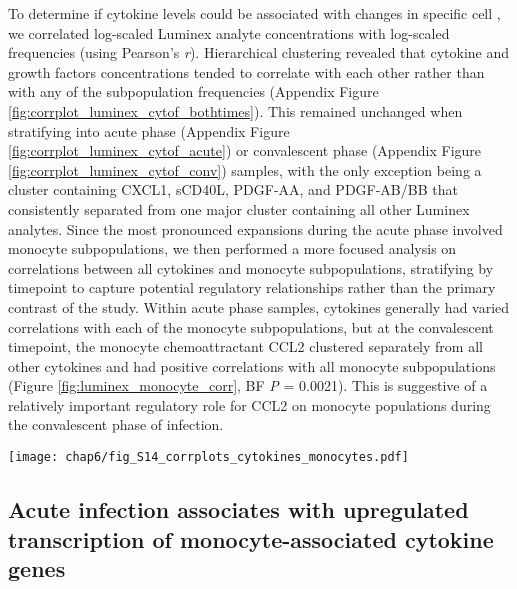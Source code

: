To determine if cytokine levels could be associated with changes in specific cell \subcommunities{}, we correlated log-scaled Luminex analyte concentrations with log-scaled \subcommunity{} frequencies (using Pearson’s \emph{r}). Hierarchical clustering revealed that cytokine and growth factors concentrations tended to correlate with each other rather than with any of the subpopulation frequencies (Appendix Figure \ref{fig:corrplot_luminex_cytof_bothtimes}). This remained unchanged when stratifying into acute phase (Appendix Figure \ref{fig:corrplot_luminex_cytof_acute}) or convalescent phase (Appendix Figure \ref{fig:corrplot_luminex_cytof_conv}) samples, with the only exception being a cluster containing CXCL1, sCD40L, PDGF-AA, and PDGF-AB/BB that consistently separated from one major cluster containing all other Luminex analytes. Since the most pronounced expansions during the acute phase involved monocyte subpopulations, we then performed a more focused analysis on correlations between all cytokines and monocyte subpopulations, stratifying by timepoint to capture potential regulatory relationships rather than the primary contrast of the study. Within acute phase samples, cytokines generally had varied correlations with each of the monocyte subpopulations, but at the convalescent timepoint, the monocyte chemoattractant CCL2 clustered separately from all other cytokines and had positive correlations with all monocyte subpopulations (Figure \ref{fig:luminex_monocyte_corr}, BF \emph{P} = 0.0021). This is suggestive of a relatively important regulatory role for CCL2 on monocyte populations during the convalescent phase of infection.

\begin{figure*}[hb]
  \centering
  \texttt{[image: chap6/fig\_S14\_corrplots\_cytokines\_monocytes.pdf]}
  \caption[Clustered heatmap of Pearson correlations between log-scaled serum cytokine concentration and log-scaled monocyte subphenotype frequencies]{
  \textbf{Clustered heatmap of Pearson correlations between log-scaled serum cytokine concentration and log-scaled monocyte subphenotype frequencies.} A, within acute phase samples. B, within convalescent phase samples.
  }
  \label{fig:luminex_monocyte_corr}
\end{figure*}

\subsection{Acute infection associates with upregulated transcription of mo\-no\-cyte-associated cytokine genes}

